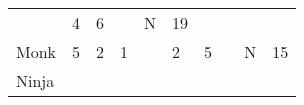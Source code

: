\documentclass[12pt]{article}
\begin{document}
\begin{longtable}[]{@{}llllllllll@{}}
\begin{minipage}[t]{0.06\columnwidth}
\strut\end{minipage} &
\begin{minipage}[t]{0.06\columnwidth}\raggedright\strut
4
\strut\end{minipage} &
\begin{minipage}[t]{0.06\columnwidth}\raggedright\strut
6
\strut\end{minipage} &
\begin{minipage}[t]{0.06\columnwidth}\raggedright\strut
\strut\end{minipage} &
\begin{minipage}[t]{0.07\columnwidth}\raggedright\strut
N
\strut\end{minipage} &
\begin{minipage}[t]{0.08\columnwidth}\raggedright\strut
19
\strut\end{minipage}\tabularnewline
\begin{minipage}[t]{0.13\columnwidth}\raggedright\strut
Monk
\strut\end{minipage} &
\begin{minipage}[t]{0.06\columnwidth}\raggedright\strut
5
\strut\end{minipage} &
\begin{minipage}[t]{0.06\columnwidth}\raggedright\strut
2
\strut\end{minipage} &
\begin{minipage}[t]{0.06\columnwidth}\raggedright\strut
1
\strut\end{minipage} &
\begin{minipage}[t]{0.06\columnwidth}\raggedright\strut
\strut\end{minipage} &
\begin{minipage}[t]{0.06\columnwidth}\raggedright\strut
2
\strut\end{minipage} &
\begin{minipage}[t]{0.06\columnwidth}\raggedright\strut
5
\strut\end{minipage} &
\begin{minipage}[t]{0.06\columnwidth}\raggedright\strut
\strut\end{minipage} &
\begin{minipage}[t]{0.07\columnwidth}\raggedright\strut
N
\strut\end{minipage} &
\begin{minipage}[t]{0.08\columnwidth}\raggedright\strut
15
\strut\end{minipage}\tabularnewline
\begin{minipage}[t]{0.13\columnwidth}\raggedright\strut
Ninja

\end{minipage}
\end{longtable}
\end{document}
